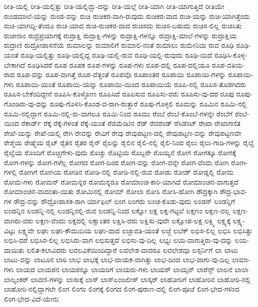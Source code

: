 {ರೀತಿ-ಯಲ್ಲಿ
ರೀತಿ-ಯಲ್ಲಿತ್ತು
ರೀತಿ-ಯಲ್ಲಿದ್ದು-ದನ್ನು
ರೀತಿ-ಯಲ್ಲೆ
ರೀತಿ-ಯಾಗಿ
ರೀತಿ-ಯಾಗುತ್ತಿದೆ
ರೀತಿಯೇ
ರುಂಡಮಾಲೆ-ಯನ್ನು
ರುಂಡ-ವನ್ನು
ರುಚಿ
ರುಚಿಕರ-ವಾಗಿ-ರುವುದು
ರುಚಿಕರ-ವಾದ
ರುಚಿ-ಯನ್ನು
ರುಚಿ-ಯಾಗಿತ್ತೆಂದು
ರುಚಿ-ಯಾಗಿದ್ದಿ-ತೆಂದೂ
ರುಚಿ-ಯಾದ
ರುಚಿ-ರುಚಿಕರ-ವಾದ
ರುಚಿಸದು
ರುಚಿಸ-ಬಹುದು
ರುಚಿಸ-ಲಿಲ್ಲ
ರುಚಿಸಿತು
ರುಚೀನಾಂ
ರುದ್ರಪ್ರಯಾಗಕ್ಕೆ
ರುದ್ರಾಕ್ಷಿ
ರುದ್ರಾಕ್ಷಿ-ಗಳನ್ನು
ರುದ್ರಾಕ್ಷಿ-ಗಳನ್ನೂ
ರುದ್ರಾಕ್ಷಿ-ಮಾಲೆ-ಗಳನ್ನು
ರುದ್ರಾಕ್ಷಿಯ
ರುದ್ರಾಣಿ
ರುದ್ರೋಪಾಸನೆಯೆ
ರುಮಾಲನ್ನು
ರುಮಾಲಿಗೆ
ರುಮಾಲಿ-ನಂತೆ
ರುಮಾಲು
ರುಮೇನಿಯ
ರುವ
ರೂಢಿ
ರೂಢಿ-ಯಂತೆ
ರೂಢಿ-ಯಲ್ಲಿತ್ತು
ರೂಢಿ-ಯಲ್ಲಿದ್ದ
ರೂಢಿ-ಯಲ್ಲಿ-ರುವ
ರೂಢಿ-ಯಲ್ಲಿ-ರುವುದು
ರೂಢಿ-ಯಿದೆ
ರೂಢಿಸಿ-ಕೊಳ್ಳ-ಬೇಕಾಗಿದೆ
ರೂಢಿಸಿದರೆ
ರೂಪ
ರೂಪಕ
ರೂಪ-ಗಳನ್ನು
ರೂಪ-ಗಳು
ರೂಪ-ದಲ್ಲಿ
ರೂಪ-ದಲ್ಲಿಯೂ
ರೂಪ-ವತಿಯ-ರಾದ
ರೂಪ-ವನ್ನು
ರೂಪ-ವಾಗಿತ್ತೆ
ರೂಪ-ವೆತ್ತಂತೆ
ರೂಪವೊ
ರೂಪಾಂತರ
ರೂಪಾಯಿ
ರೂಪಾಯಿ-ಗಳನ್ನು
ರೂಪಾಯಿ-ಗಳು
ರೂಪಾಯಿ-ಯಂತೆ
ರೂಪಾಯಿ-ಯನ್ನು
ರೂಪಾಯಿ-ಯಿಂದ
ರೂಪಾಯಿಯೆ
ರೂಪಿ-ನಲ್ಲಿ
ರೂಪಿಸ-ತೊಡಗಿದರು
ರೂಪಿಸ-ಬೇಕೆಂದಿದ್ದೇನೆ
ರೂಪಿಸಿ-ಕೊಳ್ಳೋಣ
ರೂಪಿಸಿದೆ
ರೂಪಿಸುವ
ರೂಪಿಸು-ವರು
ರೂಪಿಸು-ವು-ದರ
ರೂಪು
ರೂಪು-ಗೊಂಡಿರು-ವು-ದನ್ನು
ರೂಪು-ಗೊಳಿಸಿ-ಕೊಂಡ-ವ-ರಾಗಿ-ರುತ್ತಾರೆ
ರೂಪು-ಗೊಳ್ಳಲಿ
ರೂಮನ್ನು
ರೂಮಿನ
ರೂಮಿ-ನಲ್ಲಿ
ರೂಮಿ-ನಲ್ಲಿದ್ದಾಗ
ರೂಮಿ-ನಲ್ಲಿ-ರು-ವಾಗಲೂ
ರೂಮಿ-ನಿಂದ
ರೂಮು
ರೆಂಬೆ
ರೆಂಬೆ-ಕೊಂಬೆ-ಗಳನ್ನೇ
ರೆಂಬೆಗೆ
ರೆಂಬೆ-ಯಿಂದ
ರೆಕಾರ್ಡ್
ರೆಕ್ಕೆ
ರೆಕ್ಕೆ-ಗಳಂತೆ
ರೆಕ್ಕೆ-ಯಂತೆ
ರೆಜಿಮೆಂಟಿನ
ರೆಡ್
ರೆವರೆಂಡ್
ರೆಸಿಡೆಂಟ್
ರೇಖಾ
ರೇಖಾಗಣಿತ
ರೇಖೆ-ಯನ್ನು
ರೇಖೆ-ಯಲ್ಲಿ
ರೇಗಿ
ರೇವನ್ನು
ರೇವಿಗೆ
ರೇವು
ರೇವುಪಟ್ಟಣ-ದಲ್ಲಿ
ರೇವುಪಟ್ಟಣ-ವನ್ನು
ರೇವುಪಟ್ಟಣವೇ
ರೇಶ್ಮೆಯ
ರೇಷ್ಮೆಯ
ರೈಟ್
ರೈತನ
ರೈತರ
ರೈನ್
ರೈಲನ್ನು
ರೈಲಿನ
ರೈಲಿ-ನಲ್ಲಿ
ರೈಲಿ-ನಿಂದ
ರೈಲು
ರೈಲು-ಗಾಡಿ-ಗಳನ್ನು
ರೈಲ್ವೆ
ರೈಲ್ವೆಯ
ರೊಂದಿಗೆ
ರೊಚ್ಚಿಗೇಳು-ವುದು
ರೊಚ್ಚು
ರೊಟ್ಟಿಯ
ರೊಬ್ಬರೇ
ರೊಯ್ಯನೆ
ರೋಗ
ರೋಗಕ್ಕೂ
ರೋಗಕ್ಕೆ
ರೋಗ-ಗಳನ್ನು
ರೋಗ-ಗಳೆಲ್ಲ
ರೋಗದ
ರೋಗ-ದಿಂದ
ರೋಗ-ವನ್ನು
ರೋಗ-ವನ್ನೇ
ರೋಗ-ವೆಂದು
ರೋಗಿ
ರೋಗಿ-ಗಳಲ್ಲಿ
ರೋಗಿಗೆ
ರೋಗಿಯ
ರೋಡಿನ
ರೋಡಿ-ನಲ್ಲಿ
ರೋಡಿ-ನಲ್ಲಿ-ರುವ
ರೋಡು
ರೋಡ್
ರೋಡ್ನಲ್ಲಿ
ರೋಮ
ರೋಮ-ಗಳು
ರೋಮನ್
ರೋಮನ್ನರ
ರೋಮನ್ನರೂ
ರೋಮಾಂಚ-ಕಾರಿ-ಯಾಗಿದೆ
ರೋಮಾಂಚನ-ವಾಗುತ್ತದೆ
ರೋಮಾಂಚನ-ವಾದಂತಾ-ಯಿತು
ರೋಮಿನಲ್ಲಿ
ರೋಮ್
ರೋಲಾ
ರೋಸಿ
ರೋಸಿ-ಹೋಗಿ
ರೌದ್ರಕ್ಕಾಗಿ
ರೌದ್ರ-ಭಾವ-ಗಳ
ರೌದ್ರ-ವನ್ನು
ರೌದ್ರೋಪಾಸಕ-ರಾಗಿ
ರ್ಯಾಫಿಲ್
ಲಂಗ
ಲಂಗರು
ಲಂಚ-ಕೊಡು-ವುದು
ಲಂಡನ್
ಲಂಡನ್ನಿಗೆ
ಲಂಡನ್ನಿನ
ಲಂಡನ್ನಿ-ನಲ್ಲಿ
ಲಂಡನ್ನಿನಲ್ಲಿ-ರುವ
ಲಂಡನ್ನಿ-ನಿಂದ
ಲಕ್ನೋ
ಲಕ್ಷ
ಲಕ್ಷ-ಗಟ್ಟಲೆ
ಲಕ್ಷಣಂ
ಲಕ್ಷಣ-ವಲ್ಲ
ಲಕ್ಷಣ-ವಾಗಿರು-ವರು
ಲಕ್ಷಣ-ವೆಂದು
ಲಕ್ಷದಲ್ಲಿ
ಲಕ್ಷಾಂತರ
ಲಕ್ಷಿಸಿ-ದರು
ಲಕ್ಷಿಸು-ವುದೇ
ಲಕ್ಷೋಪ-ಲಕ್ಷ
ಲಕ್ಷ್ಮಿ
ಲಕ್ಷ್ಯಕ್ಕೆ
ಲಕ್ಷ್ಯ-ವಿಟ್ಟು
ಲಕ್ಷ್ಯವೇ
ಲಘು
ಲಘು-ಕೌಮುದಿಯ
ಲಘು-ವಾದ
ಲಜ್ಜಾವತಿ-ಯಂತೆ
ಲಜ್ಜೆ
ಲಬೆಕ್
ಲಭಿಸ-ಲಿಲ್ಲ
ಲಭಿಸಿ
ಲಭಿಸಿತ್ತು
ಲಭಿಸಿ-ದರೆ
ಲಭಿಸಿರ-ಲಿಲ್ಲ
ಲಭಿಸಿರು-ವಾಗ
ಲಭಿಸುತ್ತದೆ
ಲಭಿಸು-ವು-ದಿಲ್ಲ
ಲಭ್ಯಃ
ಲಯ-ವಾಗುತ್ತಿರು-ವು-ದನ್ನು
ಲಯ-ವಾಯಿತು
ಲಲಿತ-ಕಲಾವಿದರು
ಲವಲವಿಕೆಯಿಂದಿದ್ದಾರೆ
ಲವಲೇಶ-ವಾದರೂ
ಲವಲೇಶವೂ
ಲಸ್ಸರ್ನಿಗೆ
ಲಾ
ಲಾಟು
ಲಾಟು-ವನ್ನು
ಲಾಟೂನ
ಲಾಠಿ
ಲಾಭ
ಲಾಭಕ್ಕೆ
ಲಾಭ-ದಾಯಕ-ವಾಗಿತ್ತು
ಲಾಭ-ದಿಂದ
ಲಾಭ-ವಾಗು-ವು-ದಿಲ್ಲ
ಲಾಮಾ-ಗಳು
ಲಾಯದ
ಲಾಯರನ
ಲಾಯರನ್ನೂ
ಲಾಯರಿಗೆ
ಲಾಯರು-ಗಳು
ಲಾಯರ್
ಲಾಯ್ಸನ್
ಲಾರೆನ್ಸ್
ಲಾಲನೆ
ಲಾಲಾ
ಲಾಲ್ಶಂಕರ್
ಲಾವಣಿ-ಗಳನ್ನು
ಲಾಸಾಕ್ಕೆ
ಲಾಸ್
ಲಾಸ್ಏಂಜಲೀಸ್
ಲಾಸ್ಕರ್
ಲಾಹೋರಿಗೆ
ಲಾಹೋರಿನ
ಲಾಹೋರಿ-ನಲ್ಲಿ
ಲಾಹೋರಿ-ನಲ್ಲಿದ್ದಾಗಲೇ
ಲಿಂಗ
ಲಿಂಗಂ
ಲಿಂಗಕ್ಕೆ
ಲಿಂಗದ
ಲಿಂಗ-ಪುರಾಣ-ದಲ್ಲಿ
ಲಿಂಗ-ಪೂಜೆ
ಲಿಂಗ-ಭೇದ-ಗಳಿಂದ
ಲಿಂಗ-ಭೇದ-ವಿದೆ-ಯೇನು
}
